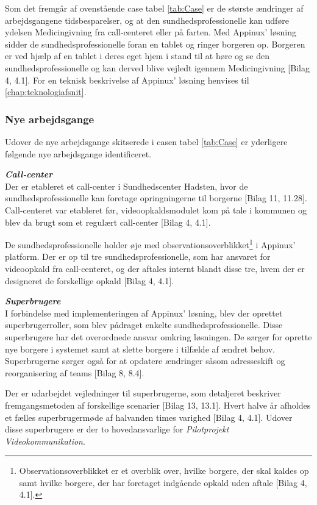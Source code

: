 Som det fremgår af ovenstående case tabel \ref{tab:Case} er de største ændringer af arbejdsgangene tidsbesparelser, og at den sundhedsprofessionelle kan udføre ydelsen Medicingivning fra call-centeret eller på farten. Med Appinux' løsning sidder de sundhedsprofessionelle foran en tablet og ringer borgeren op. Borgeren er ved hjælp af en tablet i deres eget hjem i stand til at høre og se den sundhedsprofessionelle og kan derved blive vejledt igennem Medicingivning [Bilag 4, 4.1]. For en teknisk beskrivelse af Appinux' løsning henvises til \vref{chap:teknologiafsnit}.


\subsubsection{Nye arbejdsgange}
Udover de nye arbejdsgange skitserede i casen tabel \ref{tab:Case} er yderligere følgende nye arbejdsgange identificeret. 

\textit{\textbf{Call-center}}\\
Der er etableret et call-center i Sundhedscenter Hadsten, hvor de sundhedsprofessionelle kan foretage opringningerne til borgerne [Bilag 11, 11.28]. Call-centeret var etableret før, videoopkaldsmodulet kom på tale i kommunen og blev da brugt som et regulært call-center [Bilag 4, 4.1].

De sundhedsprofessionelle holder øje med observationsoverblikket\footnote{Observationsoverblikket er et overblik over, hvilke borgere, der skal kaldes op samt hvilke borgere, der har foretaget indgående opkald uden aftale [Bilag 4, 4.1].} i Appinux' platform. Der er op til tre sundhedsprofessionelle, som har ansvaret for videoopkald fra call-centeret, og der aftales internt blandt disse tre, hvem der er designeret de forskellige opkald [Bilag 4, 4.1].

\textit{\textbf{Superbrugere}}\\ 
I forbindelse med implementeringen af Appinux' løsning, blev der oprettet superbrugerroller, som blev pådraget enkelte sundhedsprofessionelle. Disse superbrugere har det overordnede ansvar omkring løsningen. De sørger for oprette nye borgere i systemet samt at slette borgere i tilfælde af ændret behov. Superbrugerne sørger også for at opdatere ændringer såsom adresseskift og reorganisering af teams [Bilag 8, 8.4].

Der er udarbejdet vejledninger til superbrugerne, som detaljeret beskriver fremgangsmetoden af forskellige scenarier [Bilag 13, 13.1]. Hvert halve år afholdes et fælles superbrugermøde af halvanden times varighed [Bilag 4, 4.1]. Udover disse superbrugere er der to hovedansvarlige for \textit{Pilotprojekt Videokommunikation}.

